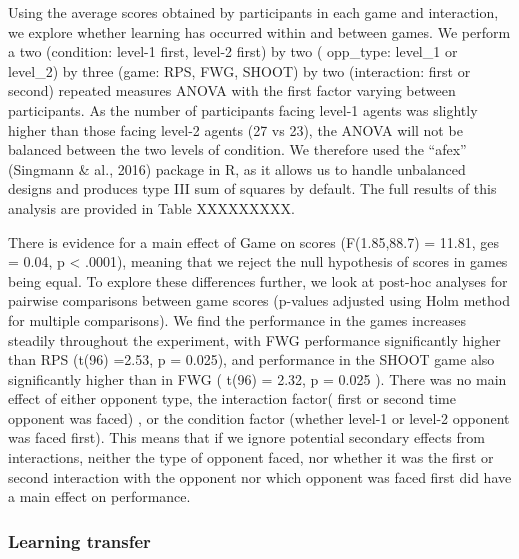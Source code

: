 \documentclass[,man,floatsintext]{apa6}
\begin{document}
Using the average scores obtained by participants in each game and interaction, we explore whether learning has occurred within and between games. We perform a two (condition: level-1 first, level-2 first) by two ( opp\_type: level\_1 or level\_2) by three (game: RPS, FWG, SHOOT) by two (interaction: first or second) repeated measures ANOVA with the first factor varying between participants. As the number of participants facing level-1 agents was slightly higher than those facing level-2 agents (27 vs 23), the ANOVA will not be balanced between the two levels of condition. We therefore used the \enquote{afex} (Singmann \& al., 2016) package in R, as it allows us to handle unbalanced designs and produces type III sum of squares by default. The full results of this analysis are provided in Table XXXXXXXXX.

There is evidence for a main effect of Game on scores (F(1.85,88.7) = 11.81, ges = 0.04, p \textless{} .0001), meaning that we reject the null hypothesis of scores in games being equal. To explore these differences further, we look at post-hoc analyses for pairwise comparisons between game scores (p-values adjusted using Holm method for multiple comparisons). We find the performance in the games increases steadily throughout the experiment, with FWG performance significantly higher than RPS (t(96) =2.53, p = 0.025), and performance in the SHOOT game also significantly higher than in FWG ( t(96) = 2.32, p = 0.025 ). There was no main effect of either opponent type, the interaction factor( first or second time opponent was faced) , or the condition factor (whether level-1 or level-2 opponent was faced first). This means that if we ignore potential secondary effects from interactions, neither the type of opponent faced, nor whether it was the first or second interaction with the opponent nor which opponent was faced first did have a main effect on performance.

\hypertarget{learning-transfer-1}{%
\subsubsection{Learning transfer}\label{learning-transfer-1}}
\end{document}
